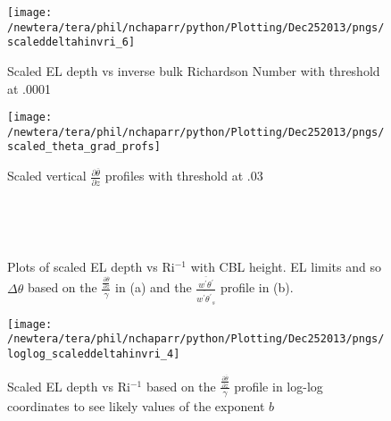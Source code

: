 \begin{figure}[htbp]
    \centering
    \texttt{[image: /newtera/tera/phil/nchaparr/python/Plotting/Dec252013/pngs/scaleddeltahinvri\_6]}
    \caption{Scaled EL depth vs inverse bulk Richardson Number with threshold at .0001}
    \label{fig:scaledeltahinvri2}   %
\end{figure}

\begin{figure}[htbp]
    \centering
    \texttt{[image: /newtera/tera/phil/nchaparr/python/Plotting/Dec252013/pngs/scaled\_theta\_grad\_profs]}
    \caption{Scaled vertical $\frac{\partial \overline{\theta}}{\partial z}$ profiles with threshold at .03}
    \label{fig:thresh3}   %
\end{figure}

\begin{figure}[htbp]
\begin{minipage}[b]{0.5\linewidth}
        \\
        \end{minipage}             
\quad
\begin{minipage}[b]{0.5\linewidth}
        \\      
       \end{minipage}
        \caption{Plots of scaled \acs{EL} depth vs \acs{Ri}$^{-1}$ with \acs{CBL} height. \acs{EL} limits and so $\Delta \theta$ based on the $\frac{\frac{\partial \overline{\theta}}{\partial z}}{\gamma}$ in (a) and the $\frac{\overline{w^{'}\theta^{'}}}{\overline{w^{'}\theta^{'}}_{s}}$ profile in (b).}
        \label{fig:}
\end{figure}


\begin{figure}[htbp]
\centering
\texttt{[image: /newtera/tera/phil/nchaparr/python/Plotting/Dec252013/pngs/loglog\_scaleddeltahinvri\_4]}\\
\caption{Scaled \acs{EL} depth vs \acs{Ri}$^{-1}$ based on the $\frac{\frac{\partial \overline{\theta}}{\partial z}}{\gamma}$ profile in log-log coordinates to see likely values of the exponent $b$}
\label{fig:ELvsri}
\end{figure}

